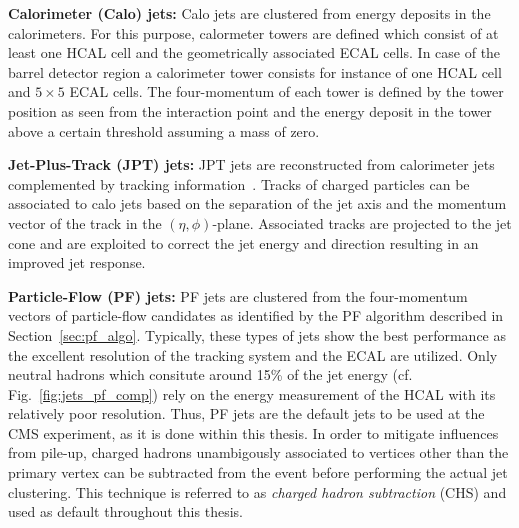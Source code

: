\begin{description}
 \item \textbf{Calorimeter (Calo) jets:} Calo jets are clustered from energy deposits in the calorimeters. For this purpose, calormeter towers are defined which consist of at least one HCAL cell and the geometrically associated ECAL cells. In case of the barrel detector region a calorimeter tower consists for instance of one HCAL cell and $\mathrm{5 \times 5}$ ECAL cells. The four-momentum of each tower is defined by the tower position as seen from the interaction point and the energy deposit in the tower above a certain threshold assuming a mass of zero. 
 \item \textbf{Jet-Plus-Track (JPT) jets:} JPT jets are reconstructed from calorimeter jets complemented by tracking information~\cite{CMS-PAS-JME-09-002}. Tracks of charged particles can be associated to calo jets based on the separation of the jet axis and the momentum vector of the track in the $(\eta,\phi)$-plane. Associated tracks are projected to the jet cone and are exploited to correct the jet energy and direction resulting in an improved jet response.
 \item \textbf{Particle-Flow (PF) jets:} PF jets are clustered from the four-momentum vectors of particle-flow candidates as identified by the PF algorithm described in Section~\ref{sec:pf_algo}. Typically, these types of jets show the best performance as the excellent resolution of the tracking system and the ECAL are utilized. Only neutral hadrons which consitute around 15\% of the jet energy (cf. Fig.~\ref{fig:jets_pf_comp}) rely on the energy measurement of the HCAL with its relatively poor resolution. Thus, PF jets are the default jets to be used at the CMS experiment, as it is done within this thesis. In order to mitigate influences from pile-up, charged hadrons unambigously associated to vertices other than the primary vertex can be subtracted from the event before performing the actual jet clustering. This technique is referred to as \textit{charged hadron subtraction} (CHS) and used as default throughout this thesis. 
\end{description}

